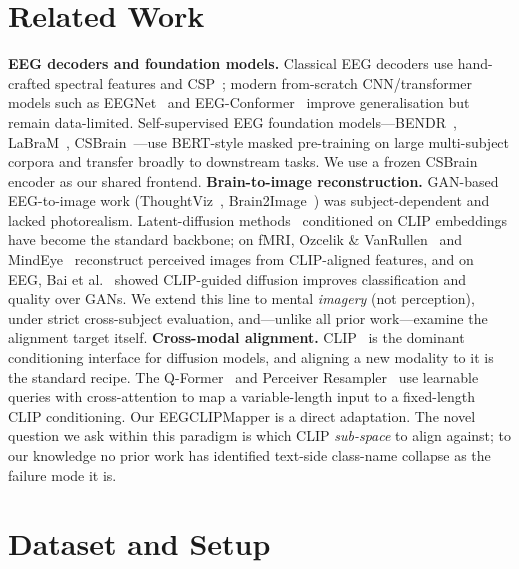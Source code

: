\documentclass{article}
\begin{document}
\section{Related Work}

\textbf{EEG decoders and foundation models.} Classical EEG decoders use hand-crafted spectral features and CSP~\citep{blankertz2007bci}; modern from-scratch CNN/transformer models such as EEGNet~\citep{lawhern2018eegnet} and EEG-Conformer~\citep{song2023eegconformer} improve generalisation but remain data-limited. Self-supervised EEG foundation models---BENDR~\citep{kostas2022bendr}, LaBraM~\citep{jiang2024labram}, CSBrain~\citep{zhu2024csbrain}---use BERT-style masked pre-training on large multi-subject corpora and transfer broadly to downstream tasks. We use a frozen CSBrain encoder as our shared frontend.
\textbf{Brain-to-image reconstruction.} GAN-based EEG-to-image work (ThoughtViz~\citep{tirupattur2018thoughtviz}, Brain2Image~\citep{kavasidis2017brain2image}) was subject-dependent and lacked photorealism. Latent-diffusion methods~\citep{rombach2022ldm} conditioned on CLIP embeddings have become the standard backbone; on fMRI, Ozcelik \& VanRullen~\citep{ozcelik2023brain} and MindEye~\citep{scotti2024mindeye} reconstruct perceived images from CLIP-aligned features, and on EEG, Bai et al.~\citep{bai2023brain} showed CLIP-guided diffusion improves classification and quality over GANs. We extend this line to mental \emph{imagery} (not perception), under strict cross-subject evaluation, and---unlike all prior work---examine the alignment target itself.
\textbf{Cross-modal alignment.} CLIP~\citep{radford2021clip} is the dominant conditioning interface for diffusion models, and aligning a new modality to it is the standard recipe. The Q-Former~\citep{li2023blip2} and Perceiver Resampler~\citep{alayrac2022flamingo} use learnable queries with cross-attention to map a variable-length input to a fixed-length CLIP conditioning. Our EEGCLIPMapper is a direct adaptation. The novel question we ask within this paradigm is which CLIP \emph{sub-space} to align against; to our knowledge no prior work has identified text-side class-name collapse as the failure mode it is.

\section{Dataset and Setup}
\label{sec:dataset}
\end{document}
